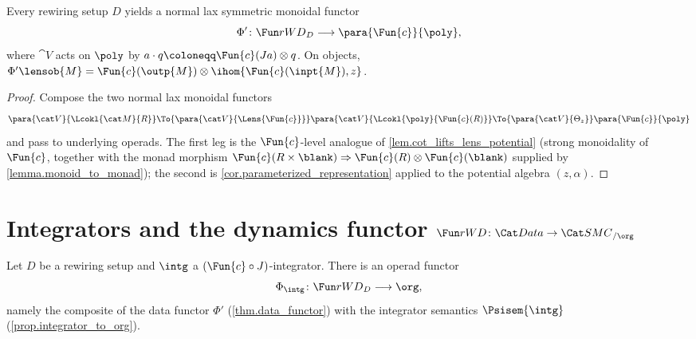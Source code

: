 
\begin{theorem}\label{thm.data_functor}
Every rewiring setup $D$ yields a normal lax symmetric monoidal functor
\[
  \Phi'\colon\rwd_D\longrightarrow\para{\Fun{c}}{\poly},
\]
where $\cat V$ acts on $\poly$ by $a\cdot q\coloneqq \Fun{c}(Ja)\otimes q$. On
objects, $\Phi'\lensob{M}=\Fun{c}(\outp{M})\otimes\ihom{\Fun{c}(\inpt{M}),z}$.
\end{theorem}

\begin{proof}
Compose the two normal lax monoidal functors
\[
  \para{\cat V}{\Lcokl{\cat M}{R}}\To{\para{\cat V}{\Lens{\Fun{c}}}}
  \para{\cat V}{\Lcokl{\poly}{\Fun{c}(R)}}\To{\para{\cat V}{\Theta_z}}
  \para{\Fun{c}}{\poly}
\]
and pass to underlying operads. The first leg is the $\Fun{c}$-level analogue of
\cref{lem.cot_lifts_lens_potential} (strong monoidality of $\Fun{c}$, together with
the monad morphism $\Fun{c}(R\times\blank)\Rightarrow\Fun{c}(R)\otimes\Fun{c}(\blank)$
supplied by \cref{lemma.monoid_to_monad}); the second is
\cref{cor.parameterized_representation} applied to the potential algebra $(z,\alpha)$.
\end{proof}

\section{Integrators and the dynamics functor
  \texorpdfstring{$\rwd\colon\Data\to\SMC_{/\org}$}{rWD: Data -> SMC/Org}}
  \label{sec.dynamics_functor_abstract}


\begin{theorem}\label{thm.dynamics_functor}
Let $D$ be a rewiring setup and $\intg$ a $(\Fun{c}\circ J)$-integrator. There is an
operad functor
\[
  \Phi_\intg\colon\rwd_D\longrightarrow\org,
\]
namely the composite of the data functor $\Phi'$ (\cref{thm.data_functor}) with
the integrator semantics $\Psisem{\intg}$ (\cref{prop.integrator_to_org}).
\end{theorem}

